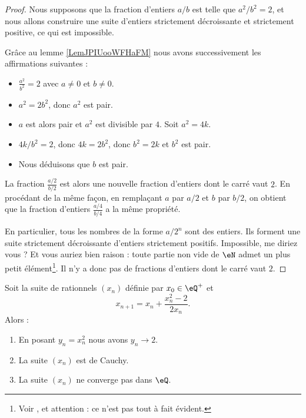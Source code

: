 \begin{proof}
    Nous supposons que la fraction d'entiers \( a/b\) est telle que \( a^2/b^2=2\), et nous allons construire une suite d'entiers strictement décroissante et strictement positive, ce qui est impossible.

    Grâce au lemme \ref{LemJPIUooWFHaFM} nous avons successivement les affirmations suivantes :
    \begin{itemize}
        \item 
        \(\frac{ a^2 }{ b^2 }=2 \)  avec \( a\neq 0\) et \( b\neq 0\).
    \item
        \( a^2=2b^2\), donc \( a^2\) est pair.
    \item
        \( a\) est alors pair et \( a^2\) est divisible par \( 4\). Soit \( a^2=4k\).
    \item
        \( 4k/b^2=2\), donc \( 4k=2b^2\), donc \( b^2=2k\) et \( b^2\) est pair.
    \item
        Nous déduisons que \( b\) est pair.
    \end{itemize}
    La fraction \( \frac{ a/2 }{ b/2 }\) est alors une nouvelle fraction d'entiers dont le carré vaut $2$. En procédant de la même façon, en remplaçant \( a\) par \( a/2\) et \( b\) par \( b/2\), on obtient que la fraction d'entiers \( \frac{ a/4 }{ b/4 }\) a la même propriété.

    En particulier, tous les nombres de la forme \( a/2^n\) sont des entiers.  Ils forment une suite strictement décroissante d'entiers strictement positifs. Impossible, me diriez vous ? Et vous auriez bien raison : toute partie non vide de \( \eN\) admet un plus petit élément\footnote{Voir \cite{RWWJooJdjxEK}, et attention : ce n'est pas tout à fait évident.}. Il n'y a donc pas de fractions d'entiers dont le carré vaut \( 2\).
\end{proof}

\begin{proposition}      \label{PROPooAHMIooVpunrF}
    Soit la suite de rationnels \( (x_n)\) définie par \( x_0\in \eQ^+\) et 
    \begin{equation}
        x_{n+1}=x_n+\frac{ x_n^2-2 }{ 2x_n }.
    \end{equation}
    Alors :
    \begin{enumerate}
        \item
            En posant \( y_n=x_n^2\) nous avons \( y_n\to 2\).
        \item
            La suite \( (x_n)\) est de Cauchy.
        \item
            La suite \( (x_n)\) ne converge pas dans \( \eQ\).
    \end{enumerate}
\end{proposition}

